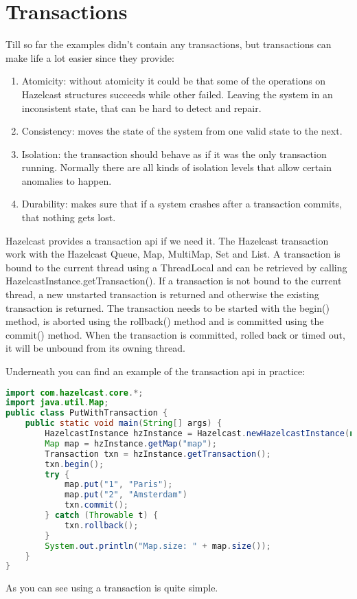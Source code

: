 \chapter{Transactions}
Till so far the examples didn't contain any transactions, but transactions can make life a lot easier since they provide:
\begin{enumerate}
\item Atomicity: without atomicity it could be that some of the operations on Hazelcast structures succeeds while other failed. Leaving the system in an inconsistent state, that can be hard to detect and repair.
\item Consistency: moves the state of the system from one valid state to the next.
\item Isolation: the transaction should behave as if it was the only transaction running. Normally there are all kinds of isolation levels that allow certain anomalies to happen.
\item Durability: makes sure that if a system crashes after a transaction commits, that nothing gets lost. 
\end{enumerate}
Hazelcast provides a transaction api if we need it. The Hazelcast transaction work with the Hazelcast Queue, Map, MultiMap, Set and List. A transaction is bound to the current thread using a ThreadLocal and can be retrieved by calling HazelcastInstance.getTransaction(). If a transaction is not bound to the current thread, a new unstarted transaction is returned and otherwise the existing transaction is returned. The transaction needs to be started with the begin() method, is aborted using the rollback() method and is committed using the commit() method. When the transaction is committed, rolled back or timed out, it will be unbound from its owning thread.

Underneath you can find an example of the transaction api in practice:
\begin{lstlisting}[language=java]
import com.hazelcast.core.*;
import java.util.Map;
public class PutWithTransaction {
    public static void main(String[] args) {
        HazelcastInstance hzInstance = Hazelcast.newHazelcastInstance(null);
        Map map = hzInstance.getMap("map");
        Transaction txn = hzInstance.getTransaction();
        txn.begin();
        try {
            map.put("1", "Paris");
            map.put("2", "Amsterdam")
            txn.commit();
        } catch (Throwable t) {
            txn.rollback();
        }
        System.out.println("Map.size: " + map.size());
    }
}
\end{lstlisting}
As you can see using a transaction is quite simple.

